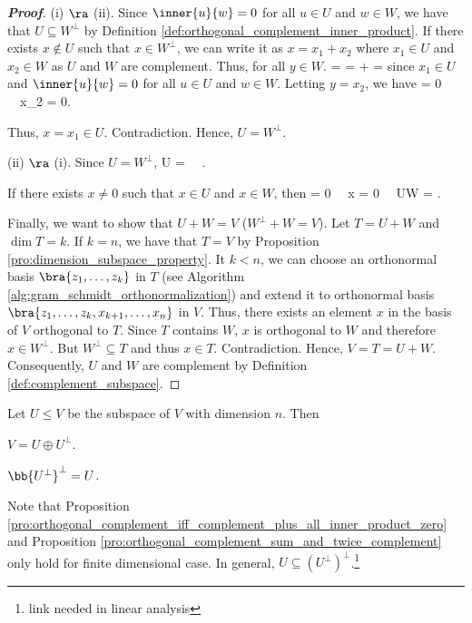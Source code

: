 \begin{proof}[\bf Proof]
(i) $\ra$ (ii). Since $\inner{u}{w} =0$ for all $u\in U$ and $w\in W$, we have that $U \subseteq W^\perp$ by Definition \ref{def:orthogonal_complement_inner_product}. If there exists $x\notin U$ such that $x\in W^\perp$, we can write it as $x = x_1 +x_2$ where $x_1\in U$ and $x_2\in W$ as $U$ and $W$ are complement. Thus, for all $y\in W$.
 =  =  +  = 
\ee
since $x_1\in U$ and $\inner{u}{w} =0$ for all $u\in U$ and $w\in W$. Letting $y = x_2$, we have
\be
{} = 0 \ \ra\ x_2 = 0.
\ee

Thus, $x=x_1\in U$. Contradiction. Hence, $U = W^\perp$.

(ii) $\ra$ (i). Since $U = W^\perp$,
\be
U =  \ \ra\ .
\ee

If there exists $x\neq 0$ such that $x\in U$ and $x\in W$, then
\be
{} = 0 \ \ra\ x = 0  \ \ra\ U\cap W = .
\ee

Finally, we want to show that $U+W = V$ ($W^\perp + W = V$). Let $T = U+W$ and $\dim T = k$. If $k = n$, we have that $T = V$ by Proposition \ref{pro:dimension_subspace_property}. It $k<n$, we can choose an orthonormal basis $\bra{z_1,\dots,z_k}$ in $T$ (see Algorithm \ref{alg:gram_schmidt_orthonormalization}) and extend it to orthonormal basis $\bra{z_1,\dots,z_k,x_{k+1},\dots,x_n}$ in $V$. Thus, there exists an element $x$ in the basis of $V$ orthogonal to $T$. Since $T$ contains $W$, $x$ is orthogonal to $W$ and therefore $x\in W^\perp$. But $W^\perp \subseteq T$ and thus $x\in T$. Contradiction. Hence, $V = T = U+W$. Consequently, $U$ and $W$ are complement by Definition \ref{def:complement_subspace}.
\end{proof}



\begin{proposition}\label{pro:orthogonal_complement_sum_and_twice_complement}
Let $U\leq V$ be the subspace of $V$ with dimension $n$. Then
\ben
\item [(i)] $V = U\oplus U^\perp$.
\item [(ii)] $\bb{U^\perp}^\perp = U$.
\een
\end{proposition}

\begin{remark}
Note that Proposition \ref{pro:orthogonal_complement_iff_complement_plus_all_inner_product_zero} and Proposition \ref{pro:orthogonal_complement_sum_and_twice_complement} only hold for finite dimensional case. In general, $U \subseteq (U^{\perp})^\perp$.\footnote{link needed in linear analysis}
\end{remark}

